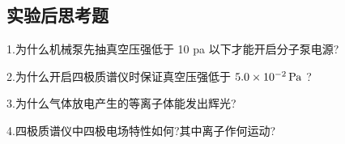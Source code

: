 \documentclass{ctexart}
\begin{document}
\subsection{实验后思考题}
1.为什么机械泵先抽真空压强低于 10 pa 以下才能开启分子泵电源?

2.为什么开启四极质谱仪时保证真空压强低于 $5.0\times 10^{-2}\,\mathrm{Pa}$ ?

3.为什么气体放电产生的等离子体能发出辉光?

4.四极质谱仪中四极电场特性如何?其中离子作何运动?



\end{document}
